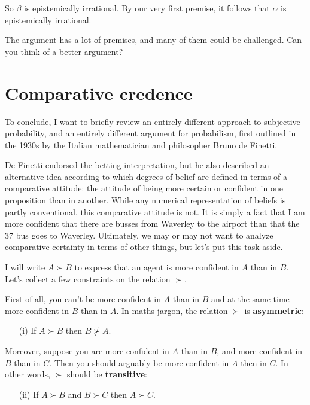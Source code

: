 So $\beta$  is epistemically irrational. By our very first premise, it
follows that $\alpha$ is epistemically irrational.

The argument has a lot of premises, and many of them could be
challenged. Can you think of a better argument?



\section{Comparative credence}\label{sec:comparative-credence}

To conclude, I want to briefly review an entirely different approach
to subjective probability, and an entirely different argument for
probabilism, first outlined in the 1930s by the Italian mathematician and
philosopher Bruno de Finetti.

De Finetti endorsed the betting interpretation, but he also described
an alternative idea according to which degrees of belief are defined
in terms of a comparative attitude: the attitude of being more certain
or confident in one proposition than in another. While any numerical
representation of beliefs is partly conventional, this comparative
attitude is not. It is simply a fact that I am more confident that
there are busses from Waverley to the airport than that the 37 bus
goes to Waverley. Ultimately, we may or may not want to analyze
comparative certainty in terms of other things, but let's put this
task aside.

I will write $A \succ B$ to express that an agent is more confident in
$A$ than in $B$. Let's collect a few constraints on the relation $\succ$.

First of all, you can't be more confident in $A$ than in
$B$ and at the same time more confident in $B$ than in $A$. In maths
jargon, the relation $\succ$ is \textbf{asymmetric}:
\begin{itemize}
  \item[(i)] If $A \succ B$ then $B \not\succ A$.
\end{itemize}

Moreover, suppose you are more confident in $A$ than in $B$, and more
confident in $B$ than in $C$. Then you should arguably be more
confident in $A$ then in $C$. In other words, $\succ$ should be
\textbf{transitive}:
\begin{itemize}
  \item[(ii)] If $A \succ B$ and  $B \succ C$ then $A \succ C$.
\end{itemize}

